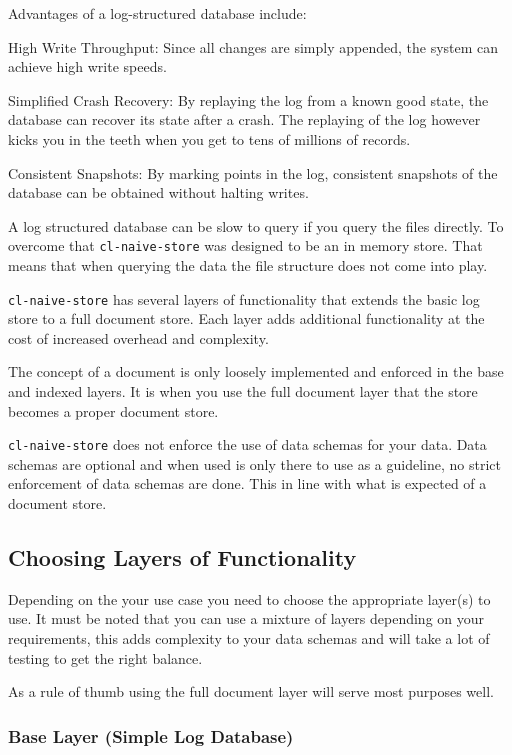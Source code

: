 \documentclass[11pt]{article}
\begin{document}
Advantages of a log-structured database include:

High Write Throughput: Since all changes are simply appended, the
system can achieve high write speeds.

Simplified Crash Recovery: By replaying the log from a known good
state, the database can recover its state after a crash. The replaying
of the log however kicks you in the teeth when you get to tens of
millions of records.

Consistent Snapshots: By marking points in the log, consistent
snapshots of the database can be obtained without halting writes.

A log structured database can be slow to query if you query the files
directly. To overcome that \texttt{cl-naive-store} was designed to be an in
memory store. That means that when querying the data the file
structure does not come into play.

\texttt{cl-naive-store} has several layers of functionality that extends the
basic log store to a full document store. Each layer adds additional
functionality at the cost of increased overhead and complexity.

The concept of a document is only loosely implemented and enforced in
the base and indexed layers. It is when you use the full document
layer that the store becomes a proper document store.

\texttt{cl-naive-store} does not enforce the use of data schemas for your
data. Data schemas are optional and when used is only there to use as
a guideline, no strict enforcement of data schemas are done. This in
line with what is expected of a document store.

\subsection{Choosing Layers of Functionality}
\label{sec:org84c2039}

Depending on the your use case you need to choose the appropriate
layer(s) to use. It must be noted that you can use a mixture of layers
depending on your requirements, this adds complexity to your data
schemas and will take a lot of testing to get the right balance.

As a rule of thumb using the full document layer will serve most
purposes well.

\subsubsection{Base Layer (Simple Log Database)}
\label{sec:org0841725}
\end{document}
